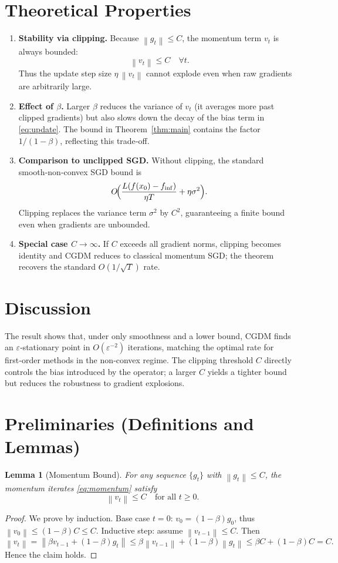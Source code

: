 \documentclass[11pt]{article}
\newtheorem{lemma}{Lemma}
\newcommand{\norm}[1]{\left\lVert #1\right\rVert}
\begin{document}
\section*{Theoretical Properties}
\begin{enumerate}[label=\arabic*.]
\item \textbf{Stability via clipping.} Because $\norm{g_t}\le C$, the momentum term $v_t$ is always bounded:
\[
    \norm{v_t}\le C\quad\forall t.
\]
Thus the update step size $\eta\,\norm{v_t}$ cannot explode even when raw gradients are arbitrarily large.

\item \textbf{Effect of $\beta$.} Larger $\beta$ reduces the variance of $v_t$ (it averages more past clipped gradients) but also slows down the decay of the bias term in \eqref{eq:update}. The bound in Theorem~\ref{thm:main} contains the factor $1/(1-\beta)$, reflecting this trade‑off.

\item \textbf{Comparison to unclipped SGD.} Without clipping, the standard smooth‑non‑convex SGD bound is
\[
    O\!\Bigl(\frac{L(f(x_0)-f_{\inf})}{\eta T}+\eta\sigma^2\Bigr).
\]
Clipping replaces the variance term $\sigma^2$ by $C^2$, guaranteeing a finite bound even when gradients are unbounded.

\item \textbf{Special case $C\to\infty$.} If $C$ exceeds all gradient norms, clipping becomes identity and CGDM reduces to classical momentum SGD; the theorem recovers the standard $O(1/\sqrt{T})$ rate.

\end{enumerate}

\section*{Discussion}
The result shows that, under only smoothness and a lower bound, CGDM finds an $\varepsilon$‑stationary point in $O(\varepsilon^{-2})$ iterations, matching the optimal rate for first‑order methods in the non‑convex regime. The clipping threshold $C$ directly controls the bias introduced by the operator; a larger $C$ yields a tighter bound but reduces the robustness to gradient explosions.

\section*{Preliminaries (Definitions and Lemmas)}
\begin{lemma}[Momentum Bound]\label{lem:momentum}
For any sequence $\{g_t\}$ with $\norm{g_t}\le C$, the momentum iterates \eqref{eq:momentum} satisfy
\[
    \norm{v_t}\le C\quad\text{for all }t\ge0 .
\]
\end{lemma}
\begin{proof}
We prove by induction.  
Base case $t=0$: $v_0=(1-\beta)g_0$, thus $\norm{v_0}\le(1-\beta)C\le C$.  
Inductive step: assume $\norm{v_{t-1}}\le C$. Then
\[
    \norm{v_t}= \norm{\beta v_{t-1}+(1-\beta)g_t}
    \le \beta\norm{v_{t-1}}+(1-\beta)\norm{g_t}
    \le \beta C+(1-\beta)C=C .
\]
Hence the claim holds. \qedhere
\end{proof}
\end{document}
